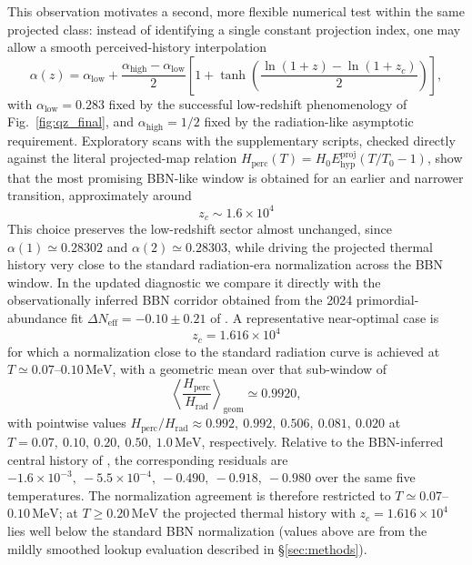 \documentclass[3p,times,twocolumn]{elsarticle}
\begin{document}
This observation motivates a second, more flexible numerical test within the same projected class: instead of identifying a single constant projection index, one may allow a smooth perceived-history interpolation
\begin{equation}
\alpha(z)=\alpha_{\mathrm{low}}+\frac{\alpha_{\mathrm{high}}-\alpha_{\mathrm{low}}}{2}
\left[
1+\tanh\!\left(
\frac{\ln(1+z)-\ln(1+z_c)}{2}
\right)
\right],
\end{equation}
with $\alpha_{\mathrm{low}}=0.283$ fixed by the successful low-redshift phenomenology of Fig.~\ref{fig:qz_final}, and $\alpha_{\mathrm{high}}=1/2$ fixed by the radiation-like asymptotic requirement. Exploratory scans with the supplementary scripts, checked directly against the literal projected-map relation $H_{\mathrm{perc}}(T)=H_0E_{\mathrm{hyp}}^{\mathrm{proj}}(T/T_0-1)$, show that the most promising BBN-like window is obtained for an earlier and narrower transition, approximately around
\begin{equation}
z_c\sim 1.6\times10^4
\end{equation}
This choice preserves the low-redshift sector almost unchanged, since $\alpha(1)\simeq0.28302$ and $\alpha(2)\simeq0.28303$, while driving the projected thermal history very close to the standard radiation-era normalization across the BBN window. In the updated diagnostic we compare it directly with the observationally inferred BBN corridor obtained from the 2024 primordial-abundance fit $\Delta N_{\mathrm{eff}}=-0.10\pm0.21$ of \cite{schoneberg2024bbn}. A representative near-optimal case is
\begin{equation}
z_c=1.616\times10^4
\end{equation}
for which a normalization close to the standard radiation curve is achieved at $T\simeq0.07$--$0.10\,\mathrm{MeV}$, with a geometric mean over that sub-window of
\begin{equation}
\left\langle \frac{H_{\mathrm{perc}}}{H_{\mathrm{rad}}}\right\rangle_{\mathrm{geom}}
\simeq 0.9920,
\end{equation}
with pointwise values
$H_{\mathrm{perc}}/H_{\mathrm{rad}} \approx
0.992,\ 0.992,\ 0.506,\ 0.081,\ 0.020$
at $T=0.07,\ 0.10,\ 0.20,\ 0.50,\ 1.0\,\mathrm{MeV}$, respectively. Relative to the BBN-inferred central history of \cite{schoneberg2024bbn}, the corresponding residuals are $-1.6\times10^{-3},\ -5.5\times10^{-4},\ -0.490,\ -0.918,\ -0.980$ over the same five temperatures. The normalization agreement is therefore restricted to $T\simeq0.07$--$0.10\,\mathrm{MeV}$; at $T\geq0.20\,\mathrm{MeV}$ the projected thermal history with $z_c=1.616\times10^4$ lies well below the standard BBN normalization (values above are from the mildly smoothed lookup evaluation described in \S\ref{sec:methods}).
\end{document}
